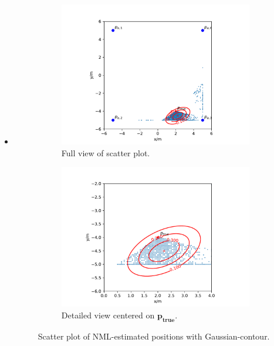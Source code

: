 \documentclass{article}
\begin{document}
\begin{itemize}
\item

\begin{figure}
\begin{subfigure}{\textwidth}
\centering
\includegraphics[width=\textwidth]{./figures/scenario3_gausscont_small_nml.pdf}
\caption{Full view of scatter plot.}
\end{subfigure}

\begin{subfigure}{\textwidth}
\includegraphics[width=\textwidth]{./figures/scenario3_gausscont_big_nml.pdf}
\caption{Detailed view centered on $\mathbf{p_{true}}$.}
\end{subfigure}
\caption{Scatter plot of NML-estimated positions with Gaussian-contour.}
\label{fig:scenario3_gausscont_nml}
\end{figure}


\end{itemize}
\end{document}
